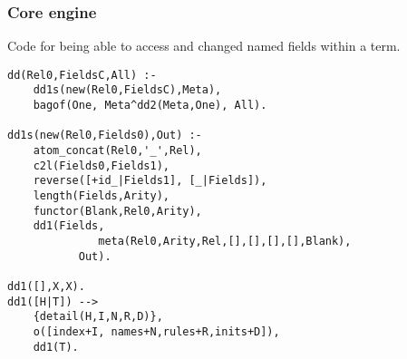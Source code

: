 \documentclass[twocolumn,global]{svjour}
\begin{document}
\subsubsection{ Core engine
}
 Code for being able to  access and changed
named fields within a term.  \begin{Verbatim}
dd(Rel0,FieldsC,All) :-
    dd1s(new(Rel0,FieldsC),Meta),
    bagof(One, Meta^dd2(Meta,One), All).

dd1s(new(Rel0,Fields0),Out) :-
    atom_concat(Rel0,'_',Rel),
    c2l(Fields0,Fields1),
    reverse([+id_|Fields1], [_|Fields]),
    length(Fields,Arity),
    functor(Blank,Rel0,Arity),
    dd1(Fields,
              meta(Rel0,Arity,Rel,[],[],[],[],Blank),
           Out).

dd1([],X,X).
dd1([H|T]) -->
    {detail(H,I,N,R,D)},
    o([index+I, names+N,rules+R,inits+D]),
    dd1(T).
\end{Verbatim}
\end{document}
